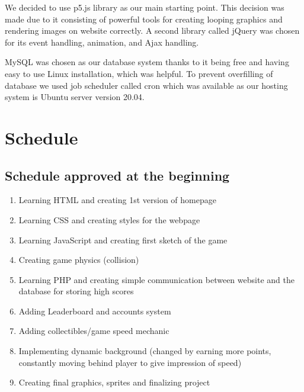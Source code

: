 \documentclass[oneside,a4paper,11pt]{report}
\begin{document}
\par
We decided to use p5.js library as our main starting point. This decision was made due to it consisting of powerful tools for creating looping graphics and rendering images on website correctly. A second library called jQuery was chosen for its event handling, animation, and Ajax handling.

\par
MySQL was chosen as our database system thanks to it being free and having easy to use Linux installation, which was helpful. To prevent overfilling of database we used job scheduler called cron which was available as our hosting system is Ubuntu server version 20.04.


\chapter{Schedule}
\section{Schedule approved at the beginning}
\begin{enumerate}
  \item Learning HTML and creating 1st version of homepage
  \item Learning CSS and creating styles for the webpage
  \item Learning JavaScript and creating first sketch of the game
  \item Creating game physics (collision)
  \item Learning PHP and creating simple communication between website and the database for storing high scores
  \item Adding Leaderboard and accounts system
  \item Adding collectibles/game speed mechanic
  \item Implementing dynamic background (changed by earning more points, constantly moving behind player to give impression of speed)
  \item Creating final graphics, sprites and finalizing project
\end{enumerate}

\newpage
\end{document}
